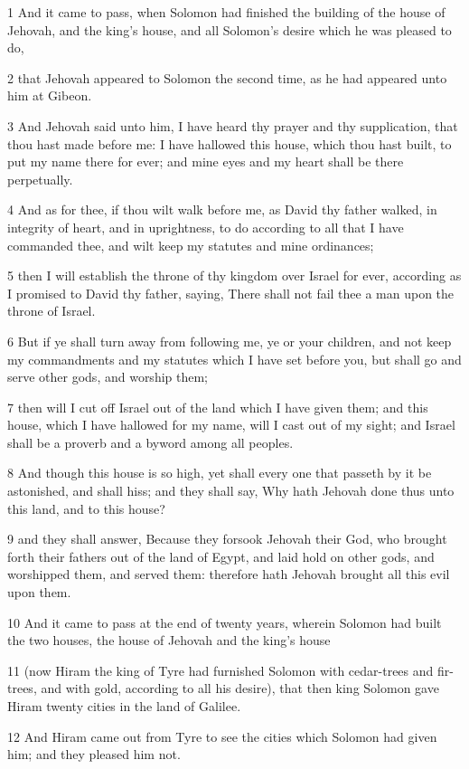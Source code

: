 \par 1 And it came to pass, when Solomon had finished the building of the house of Jehovah, and the king's house, and all Solomon's desire which he was pleased to do,
\par 2 that Jehovah appeared to Solomon the second time, as he had appeared unto him at Gibeon.
\par 3 And Jehovah said unto him, I have heard thy prayer and thy supplication, that thou hast made before me: I have hallowed this house, which thou hast built, to put my name there for ever; and mine eyes and my heart shall be there perpetually.
\par 4 And as for thee, if thou wilt walk before me, as David thy father walked, in integrity of heart, and in uprightness, to do according to all that I have commanded thee, and wilt keep my statutes and mine ordinances;
\par 5 then I will establish the throne of thy kingdom over Israel for ever, according as I promised to David thy father, saying, There shall not fail thee a man upon the throne of Israel.
\par 6 But if ye shall turn away from following me, ye or your children, and not keep my commandments and my statutes which I have set before you, but shall go and serve other gods, and worship them;
\par 7 then will I cut off Israel out of the land which I have given them; and this house, which I have hallowed for my name, will I cast out of my sight; and Israel shall be a proverb and a byword among all peoples.
\par 8 And though this house is so high, yet shall every one that passeth by it be astonished, and shall hiss; and they shall say, Why hath Jehovah done thus unto this land, and to this house?
\par 9 and they shall answer, Because they forsook Jehovah their God, who brought forth their fathers out of the land of Egypt, and laid hold on other gods, and worshipped them, and served them: therefore hath Jehovah brought all this evil upon them.
\par 10 And it came to pass at the end of twenty years, wherein Solomon had built the two houses, the house of Jehovah and the king's house
\par 11 (now Hiram the king of Tyre had furnished Solomon with cedar-trees and fir-trees, and with gold, according to all his desire), that then king Solomon gave Hiram twenty cities in the land of Galilee.
\par 12 And Hiram came out from Tyre to see the cities which Solomon had given him; and they pleased him not.

